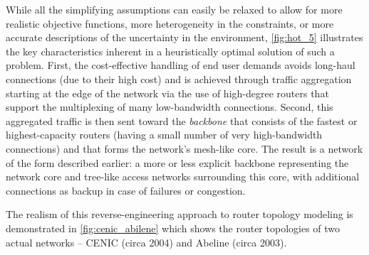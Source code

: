 While all the simplifying assumptions can easily be relaxed to allow
for more realistic objective functions, more heterogeneity in the
constraints, or more accurate descriptions of the uncertainty in the
environment, \autoref{fig:hot_5} illustrates the key characteristics
inherent in a heuristically optimal solution of such a problem. First,
the cost-effective handling of end user demands avoids long-haul
connections (due to their high cost) and is achieved through traffic
aggregation starting at the edge of the network via the use of
high-degree routers that support the multiplexing of many
low-bandwidth connections. Second, this aggregated traffic is then
sent toward the {\em backbone} that consists of the fastest or
highest-capacity routers (\ie having a small number of very
high-bandwidth connections) and that forms the network's mesh-like
core. The result is a network of the form described earlier: a more or
less explicit backbone representing the network core and tree-like
access networks surrounding this core, with additional connections
 as backup in case of failures or congestion.

 The realism of this reverse-engineering approach to router topology
 modeling is demonstrated in \autoref{fig:cenic_abilene} which shows
 the router topologies of two actual networks -- CENIC (circa 2004)
 and Abeline (circa 2003).


